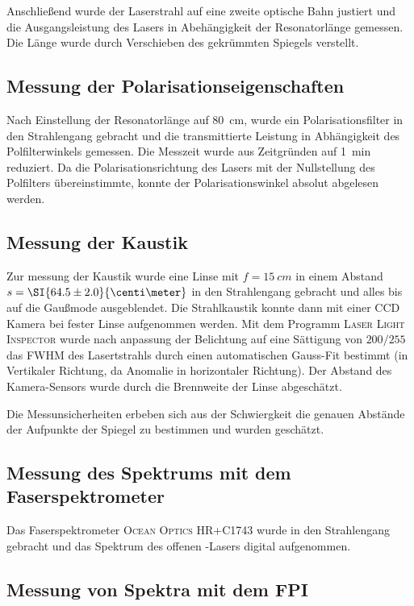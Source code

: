 \documentclass[slug=GL, room=HZDR\ Dresden/Rossendorf\,\ Geb.\ 620/123, supervisor=Tim\ Ziegler]{../../Lab_Report_LaTeX/lab_report}
\newcommand{\hne}{\ce{HeNe}-Laser}
\begin{document}
Anschlie\ss{}end wurde der Laserstrahl auf eine zweite optische Bahn
justiert und die Ausgangsleistung des Lasers in Abeh\"angigkeit der
Resonatorl\"ange gemessen. Die L\"ange wurde durch Verschieben des
gekr\"ummten Spiegels verstellt.

\subsection{Messung der Polarisationseigenschaften}
\label{sec:poleig}

Nach Einstellung der Resonatorl\"ange auf \SI{80}{\centi\meter}, wurde
ein Polarisationsfilter in den Strahlengang gebracht und die
transmittierte Leistung in Abh\"angigkeit des Polfilterwinkels
gemessen.
Die Messzeit wurde aus Zeitgr\"unden auf \SI{1}{\minute} reduziert.
Da die Polarisationsrichtung des Lasers mit der Nullstellung des
Polfilters \"ubereinstimmte, konnte der Polarisationswinkel absolut
abgelesen werden.

\subsection{Messung der Kaustik}
\label{sec:messkaus}

Zur messung der Kaustik wurde eine Linse mit \(f=\SI{15}{cm}\) in
einem Abstand \(s=\SI{64.5\pm 2.0}{\centi\meter}\) in den Strahlengang
gebracht und alles bis auf die Gau\ss{}mode ausgeblendet. Die
Strahlkaustik konnte dann mit einer CCD Kamera bei fester Linse
aufgenommen werden. Mit dem Programm \textsc{Laser Light Inspector}
wurde nach anpassung der Belichtung auf eine S\"attigung von
\(200/255\) das FWHM des Lasertstrahls durch einen automatischen
Gauss-Fit bestimmt (in Vertikaler Richtung, da Anomalie in
horizontaler Richtung). Der Abstand des Kamera-Sensors wurde durch die
Brennweite der Linse abgesch\"atzt.

Die Messunsicherheiten erbeben sich aus der Schwiergkeit die genauen
Abst\"ande der Aufpunkte der Spiegel zu bestimmen und wurden
gesch\"atzt.

\subsection{Messung des Spektrums mit dem Faserspektrometer}
\label{sec:faser}

Das Faserspektrometer \textsc{Ocean Optics HR+C1743} wurde in den
Strahlengang gebracht und das Spektrum des offenen \hne{}s digital aufgenommen.

\subsection{Messung von Spektra mit dem FPI}
\label{sec:kalibzeit}
\end{document}

